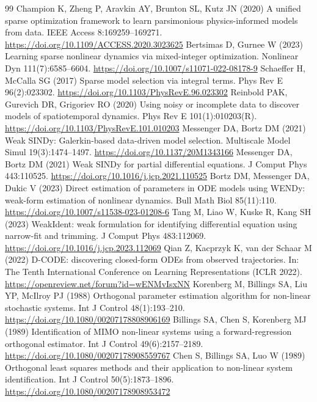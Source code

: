 \documentclass[10pt]{article}
\begin{document}
\begin{thebibliography}{99}
 Champion K, Zheng P, Aravkin AY, Brunton SL, Kutz JN (2020) A unified sparse optimization framework to learn parsimonious physics-informed models from data. IEEE Access 8:169259--169271. \url{https://doi.org/10.1109/ACCESS.2020.3023625}
 Bertsimas D, Gurnee W (2023) Learning sparse nonlinear dynamics via mixed-integer optimization. Nonlinear Dyn 111(7):6585--6604. \url{https://doi.org/10.1007/s11071-022-08178-9}
 Schaeffer H, McCalla SG (2017) Sparse model selection via integral terms. Phys Rev E 96(2):023302. \url{https://doi.org/10.1103/PhysRevE.96.023302}
 Reinbold PAK, Gurevich DR, Grigoriev RO (2020) Using noisy or incomplete data to discover models of spatiotemporal dynamics. Phys Rev E 101(1):010203(R). \url{https://doi.org/10.1103/PhysRevE.101.010203}
 Messenger DA, Bortz DM (2021) Weak SINDy: Galerkin-based data-driven model selection. Multiscale Model Simul 19(3):1474--1497. \url{https://doi.org/10.1137/20M1343166}
 Messenger DA, Bortz DM (2021) Weak SINDy for partial differential equations. J Comput Phys 443:110525. \url{https://doi.org/10.1016/j.jcp.2021.110525}
 Bortz DM, Messenger DA, Dukic V (2023) Direct estimation of parameters in ODE models using WENDy: weak-form estimation of nonlinear dynamics. Bull Math Biol 85(11):110. \url{https://doi.org/10.1007/s11538-023-01208-6}
 Tang M, Liao W, Kuske R, Kang SH (2023) WeakIdent: weak formulation for identifying differential equation using narrow-fit and trimming. J Comput Phys 483:112069. \url{https://doi.org/10.1016/j.jcp.2023.112069}
 Qian Z, Kacprzyk K, van der Schaar M (2022) D-CODE: discovering closed-form ODEs from observed trajectories. In: The Tenth International Conference on Learning Representations (ICLR 2022). \url{https://openreview.net/forum?id=wENMvIsxNN}
 Korenberg M, Billings SA, Liu YP, McIlroy PJ (1988) Orthogonal parameter estimation algorithm for non-linear stochastic systems. Int J Control 48(1):193--210. \url{https://doi.org/10.1080/00207178808906169}
 Billings SA, Chen S, Korenberg MJ (1989) Identification of MIMO non-linear systems using a forward-regression orthogonal estimator. Int J Control 49(6):2157--2189. \url{https://doi.org/10.1080/00207178908559767}
 Chen S, Billings SA, Luo W (1989) Orthogonal least squares methods and their application to non-linear system identification. Int J Control 50(5):1873--1896. \url{https://doi.org/10.1080/00207178908953472}

\end{thebibliography}
\end{document}
